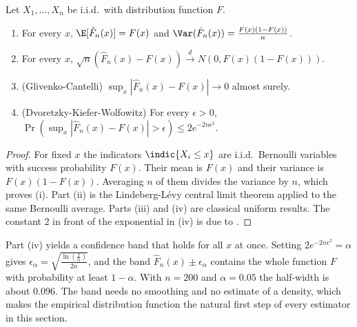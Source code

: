\begin{proposition}\label{prop:A-ecdf}
Let $X_1,\dots,X_n$ be i.i.d.\ with distribution function $F$.
\begin{enumerate}[label=(\roman*)]
\item For every $x$, $\E[\hat F_n(x)]=F(x)$ and $\Var(\hat F_n(x))=\frac{F(x)(1-F(x))}{n}$.
\item For every $x$, $\sqrt n(\hat F_n(x)-F(x))\xrightarrow{d}N(0,F(x)(1-F(x)))$.
\item (Glivenko-Cantelli) $\sup_x|\hat F_n(x)-F(x)|\to0$ almost surely.
\item (Dvoretzky-Kiefer-Wolfowitz) For every $\epsilon>0$,
$\Pr\left(\sup_x|\hat F_n(x)-F(x)|>\epsilon\right)\le2e^{-2n\epsilon^2}$.
\end{enumerate}
\end{proposition}

\begin{proof}
For fixed $x$ the indicators $\indic\{X_i\le x\}$ are i.i.d.\ Bernoulli variables with success probability
$F(x)$. Their mean is $F(x)$ and their variance is $F(x)(1-F(x))$. Averaging $n$ of them divides the
variance by $n$, which proves (i). Part (ii) is the Lindeberg-L\'evy central limit theorem applied to the
same Bernoulli average. Parts (iii) and (iv) are classical uniform results. The constant 2 in front of
the exponential in (iv) is due to \citet{Massart1990}.
\end{proof}

Part (iv) yields a confidence band that holds for all $x$ at once. Setting $2e^{-2n\epsilon^2}=\alpha$
gives $\epsilon_\alpha=\sqrt{\frac{\ln(\frac{2}{\alpha})}{2n}}$, and the band
$\hat F_n(x)\pm\epsilon_\alpha$ contains the whole function $F$ with probability at least $1-\alpha$. With
$n=200$ and $\alpha=0.05$ the half-width is about 0.096. The band needs no smoothing and no
estimate of a density, which makes the empirical distribution function the natural first step of every
estimator in this section.

